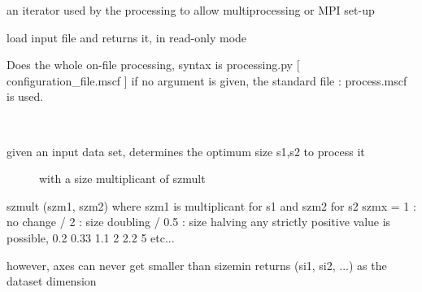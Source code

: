 \documentclass[letterpaper,10pt,openany,oneside]{sphinxmanual}
\begin{document}

\begin{fulllineitems}
\label{rst/code:processing.iterarg}
an iterator used by the processing to allow  multiprocessing or MPI set-up

\end{fulllineitems}


\begin{fulllineitems}
\label{rst/code:processing.load_input}
load input file and returns it, in read-only mode

\end{fulllineitems}


\begin{fulllineitems}
\label{rst/code:processing.main}
Does the whole on-file processing, 
syntax is
processing.py {[} configuration\_file.mscf {]}
if no argument is given, the standard file : process.mscf is used.

\end{fulllineitems}


\begin{fulllineitems}
\label{rst/code:processing.pred_sizes}~\begin{description}
\item[{given an input data set, determines the optimum size s1,s2 to process it}] \leavevmode
with a size multiplicant of szmult

\end{description}

szmult (szm1, szm2)     where szm1 is multiplicant for s1 and szm2 for s2
szmx = 1 : no change  /  2 : size doubling  /  0.5 : size halving
any strictly positive value is possible, 0.2 0.33 1.1 2 2.2 5 etc...

however, axes can never get smaller than sizemin
returns (si1, si2, ...) as the dataset dimension

\end{fulllineitems}
\end{document}
